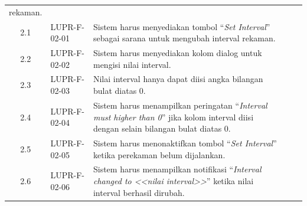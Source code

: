 {\begin{longtable}{|c|L{2.5cm}|L{5cm}|L{1.8cm}|L{2.1cm}|}
                                                          rekaman. \\
    2.1 & LUPR-F-02-01 & Sistem harus menyediakan tombol ``\emph{Set
                         Interval}'' sebagai sarana untuk mengubah
                         interval rekaman. & & \\
    2.2 & LUPR-F-02-02 & Sistem harus menyediakan kolom dialog untuk
                         mengisi nilai interval. & & \\
    2.3 & LUPR-F-02-03 & Nilai interval hanya dapat diisi angka
                         bilangan bulat diatas 0.  & & \\
    2.4 & LUPR-F-02-04 & Sistem harus menampilkan peringatan ``\emph{Interval must higher than 0}'' jika
                         kolom interval diisi dengan selain bilangan bulat diatas 0.& & \\
    2.5 & LUPR-F-02-05 & Sistem harus menonaktifkan tombol ``\emph{Set Interval}'' ketika perekaman belum
                         dijalankan. & & \\
    2.6 & LUPR-F-02-06 & Sistem harus menampilkan notifikasi ``\emph{Interval changed to <<nilai
                         interval>>}'' ketika nilai interval berhasil dirubah.  & & \\\hline
  \end{longtable}
}

